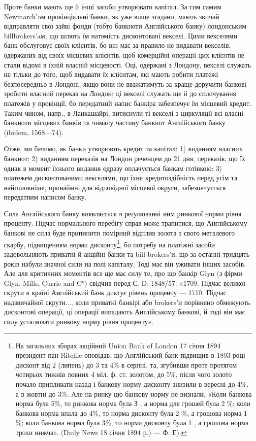 
Проте банки мають ще й інші засоби утворювати капітал. За тим самим
Newmarch’oм провінціяльні банки, як уже вище згадано, мають звичай відправляти
свої зайві фонди (тобто банкноти Англійського банку) лондонським billbrokers'aм,
що шлють їм натомість дисконтовані векселі. Цими векселями банк
обслуговує своїх клієнтів, бо він має за правило не видавати векселів, одержаних
від своїх місцевих клієнтів, щоб комерційні операції цих клієнтів не стали відомі
в їхній власній місцевості. Оці, одержані з Лондону, векселі служать не тільки
до того, щоб видавати їх клієнтам, які мають робити платежі безпосередньо
в Лондоні, якщо вони не вважатимуть за краще доручити банкові зробити
власний переказ на Лондон; ці векселі служать ще й до сплочування платежів
у провінції, бо передатний напис банкіра забезпечує їм місцевий кредит. Таким
чином, напр., в Ланкашайрі, витиснули ті векселі з циркуляції всі власні банкноти
місцевих банків та чималу частину банкнот Англійського банку (ibidem,
1568—74).

Отже, ми бачимо, як банки утворюють кредит та капітал: 1) виданням
власних банкнот; 2) виданням переказів на Лондон реченцем до 21 дня, переказів,
що їх однак в момент їхнього видання одразу оплачується банкам готівкою;
3) платежем дисконтованими векселями, що їхня кредитоздібність перед
усім та найголовніше, принаймні для відповідної місцевої округи, забезпечується
передатним написом банку.

Сила Англійського банку виявляється в реґулюванні ним ринкової норми
рівня проценту. Підчас нормального перебігу справ може трапитися, що Англійському
банкові не сила буде припинити помірний відплив золота з свого металевого
скарбу, підвищенням норми дисконту\footnote{
На загальних зборах акційний Union Bank of London 17 січня 1894 президент пан Ritchie
оповідав, що Англійський банк підвищив в 1893 році дисконт від 2  (липень) до 3 та 4\% в серпні,
та, згубивши проте протягом чотирьох тижнів повних 4  міл. ф. ст. золотом, до 5\%, після чого
золото почало припливати назад і банкову норму дисконту знизили в вересні до 4\%, а в жовтні до 3\%.
Але на ринку цю банкову норму не визнали. «Коли банкова норма була 5\%, то ринкова норма була З ,
а норма для грошей була 2 \%; коли банкова норма впала до 4\%, то норма дисконту була 2 \%, а
грошова норма 1 \%; коли банкова норма була 3\%, то норма дисконту була 1 , а грошова норма
трохи нижча». (Daily News 18 січня 1894 р.) — Ф. Е).
}, бо потребу на платіжні засоби
задовольняють приватні й акційні банки та bill-brokers’и, що за останні тридцять
років набули значної сили на полі капіталу. Тоді має він уживати інших
засобів. Але для критичних моментів все ще має силу те, про що банкір Glyn
(з фірми Glyn, Mills, Currie and C°) свідчив перед С. D. 1848/57: «1709. Підчас
великої скрути в країні Англійський банк диктує рівень проценту — 1710. Підчас
надзвичайної скрути..., коли приватні банкірі або brokers’и порівняно обмежують
дисконтові операції, ці операції випадають Англійському банкові, й тоді він має
силу усталювати ринкову норму рівня проценту».


